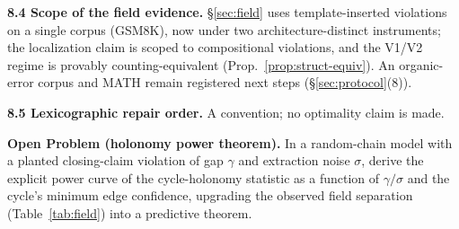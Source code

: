 \textbf{8.4 Scope of the field evidence.} \S\ref{sec:field} uses
template-inserted violations on a single corpus (GSM8K), now under two
architecture-distinct instruments; the localization claim is scoped to
compositional violations, and the V1/V2 regime is provably
counting-equivalent (Prop.~\ref{prop:struct-equiv}). An organic-error corpus
and MATH remain registered next steps (\S\ref{sec:protocol}(8)).

\textbf{8.5 Lexicographic repair order.} A convention; no optimality claim is
made.

\begin{center}
\end{center}

\medskip
\noindent\textbf{Open Problem (holonomy power theorem).} In a random-chain
model with a planted closing-claim violation of gap $\gamma$ and extraction
noise $\sigma$, derive the explicit power curve of the cycle-holonomy
statistic as a function of $\gamma/\sigma$ and the cycle's minimum edge
confidence, upgrading the observed field separation
(Table~\ref{tab:field}) into a predictive theorem.
